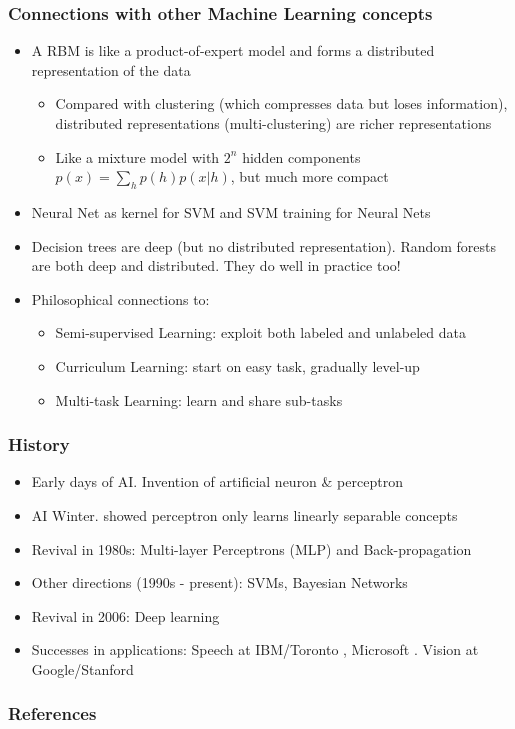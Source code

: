 \documentclass{beamer}
\newcommand{\bi}{\begin{itemize}}
\newcommand{\ei}{\end{itemize}}
\begin{document}
\begin{frame}
\frametitle{Connections with other Machine Learning concepts}
\bi
\item A RBM is like a product-of-expert model and forms a distributed representation of the data
	\bi
	\item Compared with clustering (which compresses data but loses information), distributed representations (multi-clustering) are richer representations 
	\item Like a mixture model with $2^n$ hidden components $p(x)=\sum_h p(h)p(x|h)$, but much more compact
	\ei
\pause
\item Neural Net as kernel for SVM \cite{li05mlp} and SVM training for Neural Nets \cite{collobert04links}
\pause
\item Decision trees are deep (but no distributed representation). Random forests are both deep and distributed. They do well in practice too!
\pause
\item Philosophical connections to:
	\bi
	\item Semi-supervised Learning: exploit both labeled and unlabeled data
	\item Curriculum Learning: start on easy task, gradually level-up
	\item Multi-task Learning: learn and share sub-tasks
	\ei
\ei
\end{frame}


\begin{frame}
\frametitle{History}
\begin{itemize}
\item {\color{blue} Early days of AI.} Invention of artificial neuron \cite{mcculloch43} \& perceptron \cite{rosenblatt58} \pause
\item {\color{red} AI Winter.} \cite{minsky69} showed perceptron only learns linearly separable concepts \pause
\item {\color{blue} Revival in 1980s:} Multi-layer Perceptrons (MLP) and Back-propagation \cite{rumelhart86} \pause
\item {\color{red} Other directions (1990s - present):} SVMs, Bayesian Networks \pause
\item {\color{blue} Revival in 2006:} Deep learning \cite{hinton06dbn} \pause
\item {\color{blue} Successes in applications:} Speech at IBM/Toronto \cite{sainath11deep}, Microsoft \cite{dahl12deep}.  Vision at Google/Stanford \cite{le12highlevel}  
\end{itemize}
\end{frame}


\begin{frame}[allowframebreaks]
\frametitle{References}


\end{frame}
\end{document}
